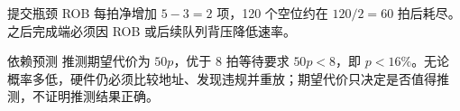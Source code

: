 \begin{chapteranswer}{提交瓶颈}
ROB 每拍净增加 $5-3=2$ 项，120 个空位约在 $120/2=60$ 拍后耗尽。之后完成端必须因 ROB 或后续队列背压降低速率。
\end{chapteranswer}

\begin{chapteranswer}{依赖预测}
推测期望代价为 $50p$，优于 8 拍等待要求 $50p<8$，即 $p<16\%$。无论概率多低，硬件仍必须比较地址、发现违规并重放；期望代价只决定是否值得推测，不证明推测结果正确。
\end{chapteranswer}
